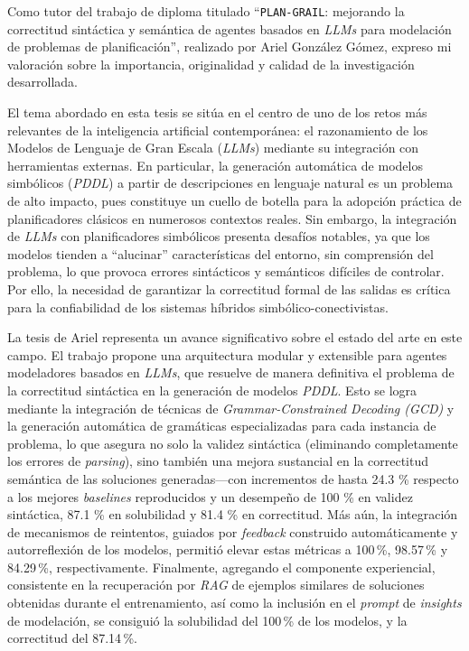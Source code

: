 \begin{opinion}
Como tutor del trabajo de diploma titulado ``\texttt{PLAN-GRAIL}: mejorando la correctitud sintáctica y semántica de agentes basados en \textit{LLMs} para modelación de problemas de planificación'', realizado por Ariel González Gómez, expreso mi valoración sobre la importancia, originalidad y calidad de la investigación desarrollada.

El tema abordado en esta tesis se sitúa en el centro de uno de los retos más relevantes de la inteligencia artificial contemporánea: el razonamiento de los Modelos de Lenguaje de Gran Escala (\textit{LLMs}) mediante su integración con herramientas externas. En particular, la generación automática de modelos simbólicos (\textit{PDDL}) a partir de descripciones en lenguaje natural es un problema de alto impacto, pues constituye un cuello de botella para la adopción práctica de planificadores clásicos en numerosos contextos reales. Sin embargo, la integración de \textit{LLMs} con planificadores simbólicos presenta desafíos notables, ya que los modelos tienden a ``alucinar'' características del entorno, sin comprensión del problema, lo que provoca errores sintácticos y semánticos difíciles de controlar. Por ello, la necesidad de garantizar la correctitud formal de las salidas es crítica para la confiabilidad de los sistemas híbridos simbólico-conectivistas.

La tesis de Ariel representa un avance significativo sobre el estado del arte en este campo. El trabajo propone una arquitectura modular y extensible para agentes modeladores basados en \textit{LLMs}, que resuelve de manera definitiva el problema de la correctitud sintáctica en la generación de modelos \textit{PDDL}. Esto se logra mediante la integración de técnicas de \textit{Grammar-Constrained Decoding (GCD)} y la generación automática de gramáticas especializadas para cada instancia de problema, lo que asegura no solo la validez sintáctica (eliminando completamente los errores de \textit{parsing}), sino también una mejora sustancial en la correctitud semántica de las soluciones generadas—con incrementos de hasta 24.3 \% respecto a los mejores \textit{baselines} reproducidos y un desempeño de 100 \% en validez sintáctica, 87.1 \% en solubilidad y 81.4 \% en correctitud. Más aún, la integración de mecanismos de reintentos, guiados por \textit{feedback} construido automáticamente y autorreflexión de los modelos, permitió elevar estas métricas a 100\,\%, 98.57\,\% y 84.29\,\%, respectivamente. Finalmente, agregando el componente experiencial, consistente en la recuperación por \textit{RAG} de ejemplos similares de soluciones obtenidas durante el entrenamiento, así como la inclusión en el \textit{prompt} de \textit{insights} de modelación, se consiguió la solubilidad del 100\,\% de los modelos, y la correctitud del 87.14\,\%.


\end{opinion}
